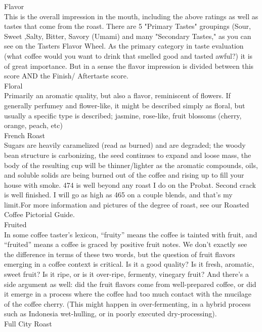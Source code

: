 \documentclass[10pt,twoside,footinclude=true,headinclude=true]{scrbook} %
\begin{document}
\begin{multicols}{2}
\medskip
{\smallcaps \small Flavor}\\
This is the overall impression in the mouth, including the above ratings as well as tastes that come from the roast. There are 5 "Primary Tastes" groupings (Sour, Sweet ,Salty, Bitter, Savory (Umami) and many "Secondary Tastes," as you can see on the Tasters Flavor Wheel. As the primary category in taste evaluation (what coffee would you want to drink that smelled good and tasted awful?) it is of great importance. But in a sense the flavor impression is divided between this score AND the Finish/ Aftertaste score.\\
\medskip
{\smallcaps \small Floral}\\
Primarily an aromatic quality, but also a flavor, reminiscent of flowers. If generally perfumey and flower-like, it might be described simply as floral, but usually a specific type is described; jasmine, rose-like, fruit blossoms (cherry, orange, peach, etc)\\
\medskip
{\smallcaps \small French Roast}\\
Sugars are heavily caramelized (read as burned) and are degraded; the woody bean structure is carbonizing, the seed continues to expand and loose mass, the body of the resulting cup will be thinner/lighter as the aromatic compounds, oils, and soluble solids are being burned out of the coffee and rising up to fill your house with smoke. 474 is well beyond any roast I do on the Probat. Second crack is well finished. I will go as high as 465 on a couple blends, and that's my limit.For more information and pictures of the degree of roast, see our  Roasted Coffee Pictorial Guide.\\
\medskip
{\smallcaps \small Fruited}\\
In some coffee taster’s lexicon, “fruity” means the coffee is tainted with fruit, and “fruited” means a coffee is graced by positive fruit notes. We don’t exactly see the difference in terms of these two words, but the question of fruit flavors emerging in a coffee context is critical. Is it a good quality? Is it fresh, aromatic, sweet fruit? Is it ripe, or is it over-ripe, fermenty, vinegary fruit? And there’s a side argument as well: did the fruit flavors come from well-prepared coffee, or did it emerge in a process where the coffee had too much contact with the mucilage of the coffee cherry. (This might happen in over-fermenting, in a hybrid process such as Indonesia wet-hulling, or in poorly executed dry-processing).\\
\medskip
{\smallcaps \small Full City Roast}\\

\end{multicols}
\end{document}
